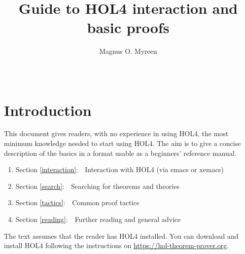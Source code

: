 \documentclass[a4paper,10pt]{article}
\begin{document}
\title{\bf\Large Guide to HOL4 interaction and basic proofs\vspace{-0.3em}}

\author{\normalsize Magnus O. Myreen}
\date{~\vspace{-2em}}

\maketitle

\newenvironment{code}{\begin{quote}%
\begin{alltt}\small}{%
\end{alltt}%
\end{quote}}
\newenvironment{enum}{\begin{enumerate}
\setlength{\itemsep}{-\parsep}
}{\end{enumerate}}

\renewcommand{\conj}{\(\begin{array}{c}\texttt{\bf\scriptsize/\textbackslash}\\[0.18em]\end{array}\)}
\newcommand{\mysec}[1]{\section{\large #1}}
\newcommand{\mysubsec}[1]{\subsection{\normalsize#1}}

\mysec{Introduction}

This document gives readers, with no experience in using HOL4, the most
minimum knowledge needed to start using HOL4. The aim is to give a
concise description of the basics in a format usable as a beginners'
reference manual.
\begin{enum}
\item[~] Section \ref{interaction}:~~Interaction with HOL4 (via emacs or xemacs)
\item[~] Section \ref{search}:~~Searching for theorems and theories
\item[~] Section \ref{tactics}:~~Common proof tactics
\item[~] Section \ref{reading}:~~Further reading and general advice
\end{enum}
The text assumes that the reader has HOL4 installed. You can download and install HOL4 following the instructions on \url{https://hol-theorem-prover.org}.
\end{document}
